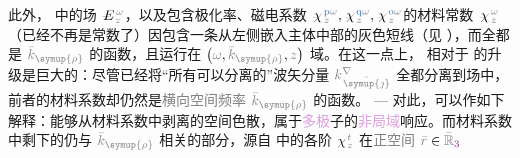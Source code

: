 此外， 中的场 $\xint{\mathcolor{gray}{-}}{25}{E}^{\;\! \mathcolor{gray}{\omega}}_{\;\! \mathcolor{gray}{z}}$，以及包含极化率、磁电系数 $\xint{{}^{}_{\mathcolor{gray}{-}}}{23}{\chi}^{\;\! \textcolor{NavyBlue}{\text{p}} \mathcolor{gray}{\omega}}_{\;\! \mathcolor{gray}{z}}, \xint{{}^{}_{\mathcolor{gray}{-}}}{23}{\chi}^{\;\! \textcolor{NavyBlue}{\text{q}} \mathcolor{gray}{\omega}}_{\;\! \mathcolor{gray}{z}}, \xint{{}^{}_{\mathcolor{gray}{-}}}{23}{\chi}^{\;\! \textcolor{NavyBlue}{\text{o}} \mathcolor{gray}{\omega}}_{\;\! \mathcolor{gray}{z}}$的材料常数 $\xint{{}^{}_{\mathcolor{gray}{-}}}{23}{\chi}^{\;\! \mathcolor{gray}{\omega}}_{\;\! \mathcolor{gray}{z}}$（已经不再是常数了）因包含一条从左侧嵌入主体中部的灰色短线（见 ），而全都是 $\mathcolor{gray}{\bar{k}_{\symup{\rho}}}$ 的函数，且运行在 $\left( \mathcolor{gray}{\omega}, \mathcolor{gray}{\bar{k}_{\symup{\rho}}}, \mathcolor{gray}{z} \right)$ 域。在这一点上， 相对于  的升级是巨大的：尽管已经将“所有可以分离的”\textcolor{PineGreen}{波矢}分量 $\mathcolor{gray}{k^\nabla_{\;\! \check{\symup{\jmath}}}}$ 全都分离到场中，前者的材料系数却仍然是\textcolor{gray}{横向}\textcolor{gray}{空间频率} $\mathcolor{gray}{\bar{k}_{\symup{\rho}}}$ 的函数。 --- 对此，可以作如下解释：能够从材料系数中剥离的空间\textcolor{NavyBlue}{色散}，属于\textcolor{Plum}{多极}子的\textcolor{Plum}{非局域}响应\cite{raabMultipoleTheoryElectromagnetism2004}。而材料系数中剩下的仍与 $\mathcolor{gray}{\bar{k}_{\symup{\rho}}}$ 相关的部分，源自  中的各阶 $\chi^{\;\! \mathcolor{gray}{t}}_{\;\! \mathcolor{gray}{z}}$ 在\textcolor{gray}{正空间} $\mathcolor{gray}{\bar{r}} \in \mathcolor{gray}{\bar{\mathbb{R}}_{\textcolor{Plum}{3}}}$ 